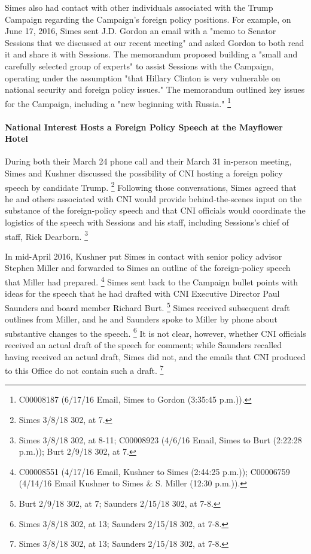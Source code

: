 Simes also had contact with other individuals associated with the Trump Campaign regarding the Campaign's foreign policy positions.
For example, on June 17, 2016, Simes sent J.D. Gordon an email with a "memo to Senator Sessions that we discussed at our recent meeting" and asked Gordon to both read it and share it with Sessions.
The memorandum proposed building a "small and carefully selected group of experts" to assist Sessions with the Campaign, operating under the assumption "that Hillary Clinton is very vulnerable on national security and foreign policy issues."
The memorandum outlined key issues for the Campaign, including a "new beginning with Russia."%
\footnote{C00008187 (6/17/16 Email, Simes to Gordon (3:35:45 p.m.)).}

\paragraph{National Interest Hosts a Foreign Policy Speech at the Mayflower Hotel}

During both their March 24 phone call and their March 31 in-person meeting, Simes and Kushner discussed the possibility of CNI hosting a foreign policy speech by candidate Trump.%
\footnote{Simes 3/8/18 302, at 7.}
Following those conversations, Simes agreed that he and others associated with CNI would provide behind-the-scenes input on the substance of the foreign-policy speech and that CNI officials would coordinate the logistics of the speech with Sessions and his staff, including Sessions's chief of staff, Rick Dearborn.%
\footnote{Simes 3/8/18 302, at 8-11;
C00008923 (4/6/16 Email, Simes to Burt (2:22:28 p.m.));
Burt 2/9/18 302, at 7.}

In mid-April 2016, Kushner put Simes in contact with senior policy advisor Stephen Miller and forwarded to Simes an outline of the foreign-policy speech that Miller had prepared.%
\footnote{C00008551 (4/17/16 Email, Kushner to Simes (2:44:25 p.m.));
C00006759 (4/14/16 Email Kushner to Simes \& S. Miller (12:30 p.m.)).}
Simes sent back to the Campaign bullet points with ideas for the speech that he had drafted with CNI Executive Director Paul Saunders and board member Richard Burt.%
\footnote{Burt 2/9/18 302, at 7;
Saunders 2/15/18 302, at 7-8.}
Simes received subsequent draft outlines from Miller, and he and Saunders spoke to Miller by phone about substantive changes to the speech.%
\footnote{Simes 3/8/18 302, at 13;
Saunders 2/15/18 302, at 7-8.}
It is not clear, however, whether CNI officials received an actual draft of the speech for comment; while Saunders recalled having received an actual draft, Simes did not, and the emails that CNI produced to this Office do not contain such a draft.%
\footnote{Simes 3/8/18 302, at 13;
Saunders 2/15/18 302, at 7-8.}

